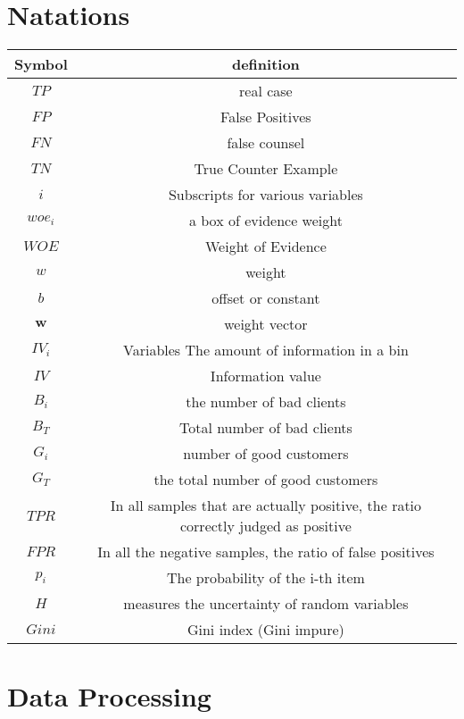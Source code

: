 \documentclass{mcmthesis}
\begin{document}
\section{Natations}
\begin{tabular}{cc}
\toprule
Symbol & definition\\
\hline
$TP$ & real case \\
\hline
$FP$ & False Positives\\
\hline
$FN$ & false counsel\\
\hline
$TN$ & True Counter Example\\
\hline
$i$ & Subscripts for various variables \\
\hline
$woe_i$ & a box of evidence weight \\
\hline
$WOE$ & Weight of Evidence \\
\hline
$w$ & weight \\
\hline
$b$ & offset or constant \\
\hline
$\mathbf{w}$ & weight vector \\
\hline
$IV_i$ & Variables The amount of information in a bin \\
\hline
$IV$ & Information value \\
\hline
$B_i$ & the number of bad clients \\
\hline
$B_T$ & Total number of bad clients \\
\hline
$G_i$ & number of good customers \\
\hline
$G_T$ & the total number of good customers \\
\hline
$TPR$ & In all samples that are actually positive, the ratio correctly judged as positive\\
\hline
$FPR$ & In all the negative samples, the ratio of false positives\\
\hline
$p_i$ & The probability of the i-th item\\
\hline
$H$ & measures the uncertainty of random variables\\
\hline
$Gini$ & Gini index (Gini impure)\\
\hline
\end{tabular}

\section{Data Processing}
\end{document}
